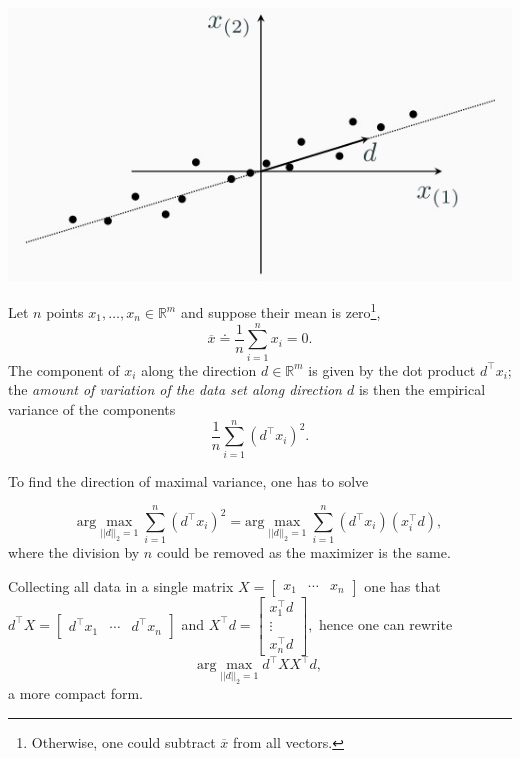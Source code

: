 \documentclass[10pt]{report}
\begin{document}
\begin{center}
\includegraphics[scale=0.3]{./pics/alg/pca1.jpg}
\end{center}

Let \(n\) points \(x_1, \dots, x_n \in \mathbb{R}^m\) and suppose their mean is zero\footnote{Otherwise, one could subtract $\overline x$ from all vectors.}, $$\overline x \doteq \frac 1 n \sum_{i=1}^n x_i = 0.$$ The component of \(x_i\) along the direction \(d\in\mathbb{R}^m\) is given by the dot product \(d^\top x_i\); the \emph{amount of variation of the data set along direction \(d\)} is then the empirical variance of the components $$\frac 1 n \sum_{i=1}^n \left(d^\top x_i\right)^2.$$

To find the direction of maximal variance, one has to solve

$$\mbox{arg}\max_{||d||_2 = 1} \sum_{i=1}^n \left(d^\top x_i\right)^2 = \mbox{arg}\max_{||d||_2=1} \sum_{i=1}^n \left(d^\top x_i\right)\left(x_i^\top d\right),$$ where the division by \(n\) could be removed as the maximizer is the same.

Collecting all data in a single matrix \(X = \begin{bmatrix}x_1 & \cdots & x_n\end{bmatrix}\) one has that \(d^\top X =\begin{bmatrix}d^\top x_1 & \cdots & d^\top x_n\end{bmatrix}\) and \(X^\top d = \begin{bmatrix}x_1^\top d \\ \vdots \\ x_n^\top d\end{bmatrix},\) hence one can rewrite $$\mbox{arg}\max_{||d||_2=1} d^\top XX^\top d,$$ a more compact form.
\end{document}

